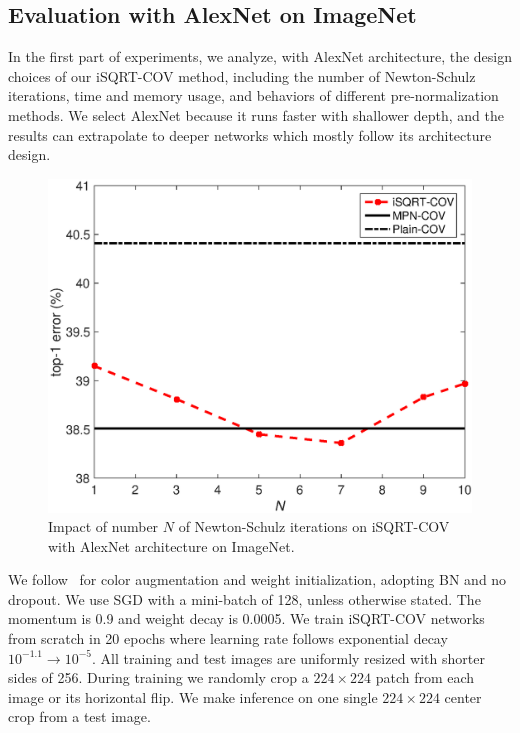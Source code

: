 \documentclass[10pt,twocolumn,letterpaper]{article}
\begin{document}
\subsection{Evaluation with AlexNet on ImageNet}\label{section:ImageNet-AlexNet}

In the first part of experiments, we analyze, with AlexNet architecture, the design choices of our iSQRT-COV method, including the number of Newton-Schulz iterations,  time and memory usage, and behaviors of different pre-normalization methods.  We select AlexNet because it runs faster with shallower depth, and the results can  extrapolate to deeper networks  which mostly follow its architecture design. 


\begin{figure}
\centering
\begin{minipage}[b]{0.65\linewidth}
\centering
\includegraphics[width=1.0\textwidth]{iter.eps}
\end{minipage}
\caption{Impact of  number $N$ of Newton-Schulz iterations on iSQRT-COV with AlexNet architecture on ImageNet.}
\label{fig:impact_iteration-N}
\end{figure}

We follow~\cite{Li_2017_ICCV} for color augmentation and weight initialization, adopting BN and no dropout. We use SGD with  a mini-batch of 128,  unless otherwise stated. The momentum is  0.9 and  weight decay is 0.0005. We train iSQRT-COV networks from scratch in 20 epochs where  learning rate follows exponential decay  $10^{-1.1} \to 10^{-5}$. All training and test images are uniformly resized with shorter sides of 256. During training we randomly crop a $224\times224$ patch from each image or its horizontal flip. We make inference on one single  $224\times 224$ center crop from a test image. 
\end{document}
